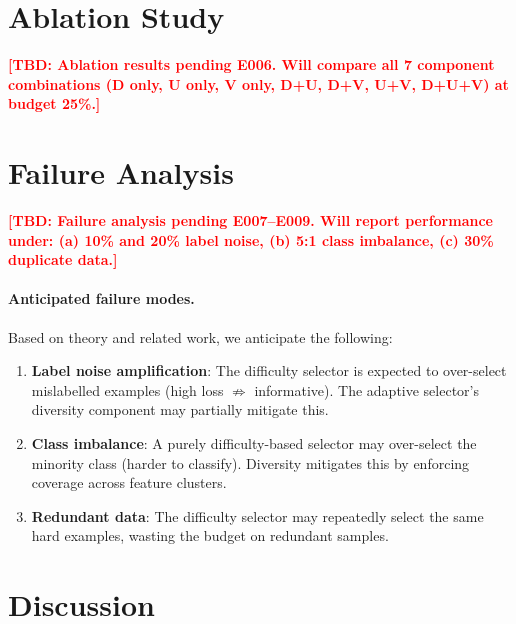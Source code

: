 \documentclass[10pt,twocolumn]{article}
\newcommand{\tbd}[1]{\textcolor{red}{\textbf{[TBD: #1]}}}
\begin{document}
\section{Ablation Study}
\label{sec:ablation}

\tbd{Ablation results pending E006. Will compare all 7 component combinations
(D only, U only, V only, D+U, D+V, U+V, D+U+V) at budget 25\%.}

\section{Failure Analysis}
\label{sec:failure}

\tbd{Failure analysis pending E007--E009. Will report performance under:
(a) 10\% and 20\% label noise, (b) 5:1 class imbalance, (c) 30\% duplicate data.}

\paragraph{Anticipated failure modes.}
Based on theory and related work, we anticipate the following:

\begin{enumerate}
  \item \textbf{Label noise amplification}: The difficulty selector is expected
    to over-select mislabelled examples (high loss $\not\Rightarrow$ informative).
    The adaptive selector's diversity component may partially mitigate this.
  \item \textbf{Class imbalance}: A purely difficulty-based selector may over-select
    the minority class (harder to classify). Diversity mitigates this by enforcing
    coverage across feature clusters.
  \item \textbf{Redundant data}: The difficulty selector may repeatedly select
    the same hard examples, wasting the budget on redundant samples.
\end{enumerate}

\section{Discussion}
\label{sec:discussion}
\end{document}

